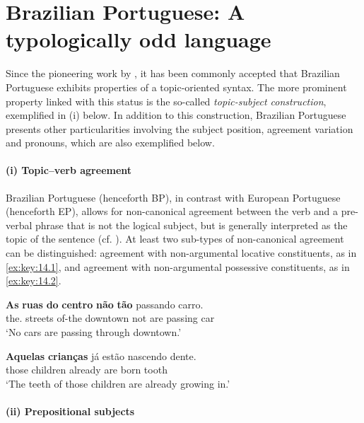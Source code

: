 \documentclass[output=paper]{langsci/langscibook}
\begin{document}
\section{Brazilian Portuguese: A typologically odd language}\label{sec:key:14.2}

Since the pioneering work by \citet{Pontes1987}, it has been commonly accepted
that Brazilian Portuguese exhibits properties of a topic-oriented syntax. The
more prominent property linked with this status is the so-called
\emph{topic-subject construction}, exemplified in (i) below. In addition to
this construction, Brazilian Portuguese presents other particularities
involving the subject position, agreement variation and pronouns, which are
also exemplified below.

\paragraph*{(i) Topic--verb agreement}

Brazilian Portuguese (henceforth \gls{BP}), in contrast with
European Portuguese (henceforth \gls{EP}), allows for
non-canonical agreement between the verb and a pre-verbal phrase that is not
the logical subject, but is generally interpreted as the topic of the sentence
(cf.
\citealt{DuarteKato2008,AvelarGalves2011,Toniette2013,MunhozNaves2012,Nunes2017}).
At least two sub-types of non-canonical agreement can be distinguished:
agreement with non-argumental locative constituents, as in \eqref{ex:key:14.1},
and agreement with non-argumental possessive constituents, as in
\eqref{ex:key:14.2}.

\ea\label{ex:key:14.1}
    \sn
    \gll \textbf{As} \textbf{ruas} \textbf{do} \textbf{centro} \textbf{não} \textbf{tão} passando carro.\\
        the.\Pl{} streets of-the downtown not are passing car\\
    \glt ‘No cars are passing through downtown.’\\
\z

\ea\label{ex:key:14.2}
    \sn
    \gll \textbf{Aquelas} \textbf{crianças} já estão nascendo dente.\\
        those children already are born tooth\\
    \glt ‘The teeth of those children are already growing in.’
\z

\paragraph*{(ii) Prepositional subjects}
\end{document}

